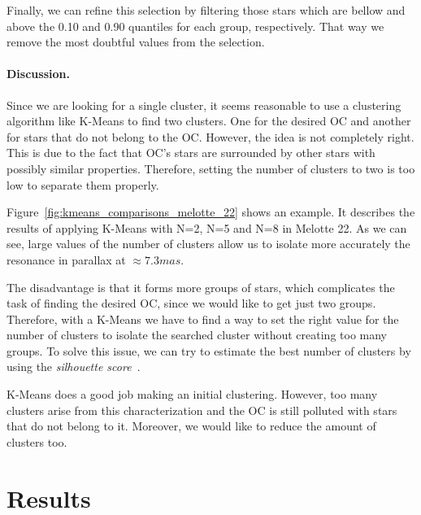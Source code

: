 \documentclass[11pt,a4paper,english,twocolumn]{article}
\begin{document}
Finally, we can refine this selection by filtering those stars which are bellow and above
the 0.10 and 0.90 quantiles for each group, respectively. That way we remove the most
doubtful values from the selection.

\paragraph{Discussion.}

Since we are looking for a single cluster, it seems reasonable to use a clustering algorithm
like K-Means to find two clusters. One for the desired OC and another for stars that do not
belong to the OC. However, the idea is not completely right. This is due to the fact that OC's
stars are surrounded by other stars with possibly similar properties. Therefore, setting the
number of clusters to two is too low to separate them properly.

Figure~\ref{fig:kmeans_comparisons_melotte_22} shows an example. It describes the results of
applying K-Means with N=2, N=5 and N=8 in Melotte 22. As we can see, large values of the number
of clusters allow us to isolate more accurately the resonance in parallax at \(\approx 7.3mas\).

The disadvantage is that it forms more groups of stars, which complicates the task of finding the
desired OC, since we would like to get just two groups. Therefore, with a K-Means we have to find
a way to set the right value for the number of clusters to isolate the searched cluster without
creating too many groups. To solve this issue, we can try to estimate the best number of clusters
by using the \emph{silhouette score}~\cite{rousseeuw1987silhouettes}.

K-Means does a good job making an initial clustering. However, too many clusters arise
from this characterization and the OC is still polluted with stars that do not belong to it.
Moreover, we would like to reduce the amount of clusters too.

\section{Results}
\label{sec:results}
\end{document}
